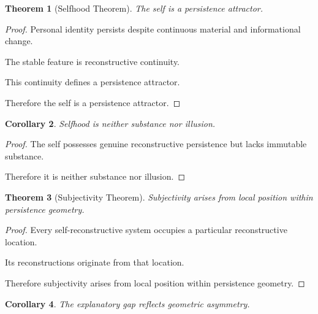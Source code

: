 \documentclass[12pt,oneside]{article}
\newtheorem{theorem}{Theorem}[section] \newtheorem{lemma}[theorem]{Lemma} \newtheorem{proposition}[theorem]{Proposition} \newtheorem{corollary}[theorem]{Corollary}
\theoremstyle{definition}
\begin{document}
\begin{theorem}[Selfhood Theorem]

The self is a persistence attractor.

\end{theorem}

\begin{proof}

Personal identity persists despite continuous material and informational change.

The stable feature is reconstructive continuity.

This continuity defines a persistence attractor.

Therefore the self is a persistence attractor.

\end{proof}

\begin{corollary}

Selfhood is neither substance nor illusion.

\end{corollary}

\begin{proof}

The self possesses genuine reconstructive persistence but lacks immutable substance.

Therefore it is neither substance nor illusion.

\end{proof}

\begin{theorem}[Subjectivity Theorem]

Subjectivity arises from local position within persistence geometry.

\end{theorem}

\begin{proof}

Every self-reconstructive system occupies a particular reconstructive location.

Its reconstructions originate from that location.

Therefore subjectivity arises from local position within persistence geometry.

\end{proof}

\begin{corollary}

The explanatory gap reflects geometric asymmetry.

\end{corollary}
\end{document}
